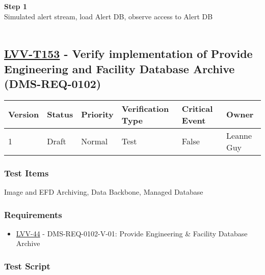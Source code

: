 \textbf{Step 1}\\
Simulated alert stream, load Alert DB, observe access to Alert DB\\
~\\

\hypertarget{lvv-t153---verify-implementation-of-provide-engineering-and-facility-database-archive-dms-req-0102}{%
\subsection{\texorpdfstring{\href{https://jira.lsstcorp.org/secure/Tests.jspa\#/testCase/LVV-T153}{LVV-T153}
- Verify implementation of Provide Engineering and Facility Database
Archive
(DMS-REQ-0102)}{LVV-T153 - Verify implementation of Provide Engineering and Facility Database Archive (DMS-REQ-0102)}}\label{lvv-t153---verify-implementation-of-provide-engineering-and-facility-database-archive-dms-req-0102}}

\begin{longtable}[]{@{}llllll@{}}
\toprule
Version & Status & Priority & Verification Type & Critical Event &
Owner\tabularnewline
\midrule
\endhead
1 & Draft & Normal & Test & False & Leanne Guy\tabularnewline
\bottomrule
\end{longtable}

\hypertarget{test-items-129}{%
\subsubsection{Test Items}\label{test-items-129}}

Image and EFD Archiving, Data Backbone, Managed Database~

\hypertarget{requirements-130}{%
\subsubsection{Requirements}\label{requirements-130}}

\begin{itemize}
\tightlist
\item
  \href{https://jira.lsstcorp.org/browse/LVV-44}{LVV-44} -
  DMS-REQ-0102-V-01: Provide Engineering \& Facility Database Archive
\end{itemize}

\hypertarget{test-script-130}{%
\subsubsection{Test Script}\label{test-script-130}}

